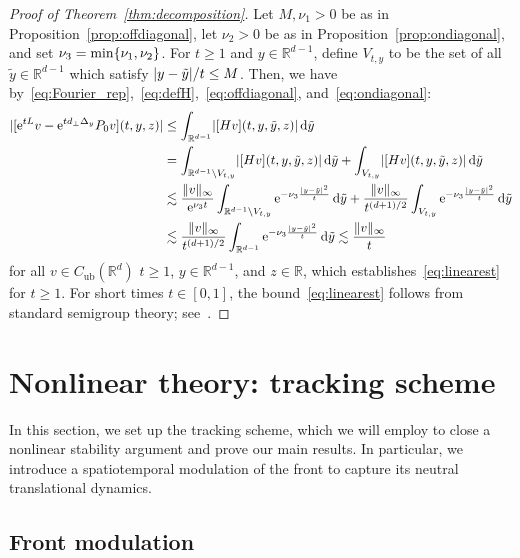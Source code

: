 \documentclass[12pt,oneside,a4paper,reqno]{amsart}
\numberwithin{equation}{section}
\theoremstyle{definition}
\theoremstyle{remark}
\newcommand{\bbR}{{\mathbb R}}
\newcommand{\rd}{{\,\rm{d}}}
\newcommand{\Cub}{{C_{\mathrm{ub}}}}
\newcommand{\re}{{\rm e}}
\DeclarePairedDelimiter{\abs}{\lvert}{\rvert}
\DeclarePairedDelimiter{\cur}{\{}{\}}
\begin{document}
\begin{proof}[Proof of Theorem~\ref{thm:decomposition}]
    Let $M,\nu_1 > 0$ be as in Proposition~\ref{prop:offdiagonal}, let $\nu_2 > 0$ be as in Proposition~\ref{prop:ondiagonal}, and set $\nu_3 = \min\cur{\nu_1,\nu_2}$.
    For $t \geq 1$ and $y \in \bbR^{d-1}$, define $V_{t,y}$ to be the set of all $\tilde{y} \in \bbR^{d-1}$ which satisfy $\abs{y - \tilde{y}} / t \leq M$.
    Then, we have by~\eqref{eq:Fourier_rep},~\eqref{eq:defH},~\eqref{eq:offdiagonal}, and~\eqref{eq:ondiagonal}:
    \begin{align*}
        \abs{[\re^{tL}v - \re^{td_{\bot}\Delta_y}P_0 v](t,y,z)}
        &\leq \int_{\bbR^{d-1}} \abs{[Hv](t,y,\tilde{y},z)} \rd \tilde{y} \\
        &= \int_{\bbR^{d-1} \setminus V_{t,y}} \abs{[Hv](t,y,\tilde{y},z)} \rd \tilde{y} 
        + \int_{V_{t,y}} \abs{[Hv](t,y,\tilde{y},z)} \rd \tilde{y} \\
        &\lesssim \frac{\|v\|_\infty}{\re^{\nu_3 t}}\int_{\bbR^{d-1}\setminus V_{t,y}} \re^{-\nu_3\frac{\abs{y - \tilde{y}}^2}{t}} \rd \tilde{y}
        + \frac{\|v\|_\infty}{t^{(d+1)/2}} \int_{V_{t,y}} \re^{-\nu_3\frac{\abs{y - \tilde{y}}^2}{t}} \rd \tilde{y} \\
        &\lesssim  \frac{\|v\|_\infty}{t^{(d+1)/2}} \int_{\bbR^{d-1}}\re^{-\nu_3 \frac{\abs{y - \tilde{y}}^2}{t}} \rd \tilde{y} 
        \lesssim \frac{\|v\|_\infty}{t}
    \end{align*}
    for all $v \in \Cub(\bbR^d)$ $t \geq 1$, $y \in \bbR^{d-1}$, and $z \in \bbR$,    
    which establishes~\eqref{eq:linearest} for $t \geq 1$.
    For short times $t \in [0,1]$, the bound~\eqref{eq:linearest} follows from standard semigroup theory; see~\cite[Proposition~I.5.5]{engel_oneparameter_2000}.
\end{proof}

\section{Nonlinear theory:  tracking scheme}
\label{sec:modulation}
In this section, we set up the tracking scheme, which we will employ to close a nonlinear stability argument and prove our main results. In particular, we introduce a spatiotemporal modulation of the front to capture its neutral translational dynamics.

\subsection{Front modulation}
\label{subsec:shift}
\end{document}
